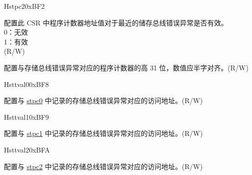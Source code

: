 \begin{register}{H}{stpc2}{0xBF2}\label{regdesc:STPC2}%
%
%
\regnewline%
\begin{regdesc}\begin{reglist}
\label{fielddesc:STPC2_VLD}\item [VLD] 配置此 CSR 中程序计数器地址值对于最近的储存总线错误异常是否有效。\\
0：无效\\
1：有效\\
(R/W)
\label{fielddesc:STPC2_ADDR}\item [{ADDR}] 配置与存储总线错误异常对应的程序计数器的高 31 位，数值应半字对齐。(R/W)
\end{reglist}\end{regdesc}
\end{register}
\begin{register}{H}{sttval0}{0xBF8}\label{regdesc:STTVAL0}%
%
\regnewline%
\begin{regdesc}\begin{reglist}
\label{fielddesc:STTVAL0_ADDR}\item [{ADDR}] 配置与 \hyperref[regdesc:STPC0]{stpc0} 中记录的存储总线错误异常对应的访问地址。(R/W)
\end{reglist}\end{regdesc}
\end{register}
\begin{register}{H}{sttval1}{0xBF9}\label{regdesc:STTVAL1}%
%
\regnewline%
\begin{regdesc}\begin{reglist}
\label{fielddesc:STTVAL1_ADDR}\item [{ADDR}] 配置与 \hyperref[regdesc:STPC1]{stpc1} 中记录的存储总线错误异常对应的访问地址。(R/W)
\end{reglist}\end{regdesc}
\end{register}

\begin{register}{H}{sttval2}{0xBFA}\label{regdesc:STTVAL2}%
%
\regnewline%
\begin{regdesc}\begin{reglist}
\label{fielddesc:STTVAL2_ADDR}\item [{ADDR}] 配置与 \hyperref[regdesc:STPC2]{stpc2} 中记录的存储总线错误异常对应的访问地址。(R/W)
\end{reglist}\end{regdesc}
\end{register}
